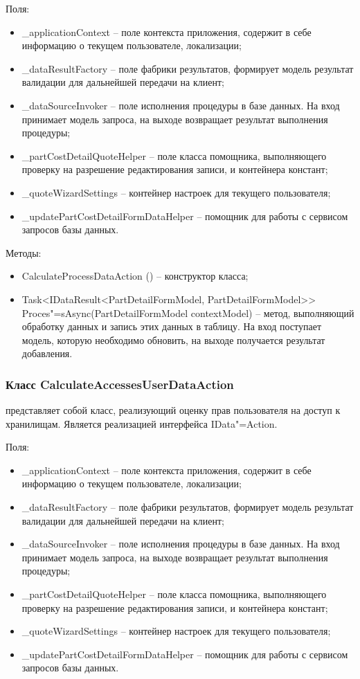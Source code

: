 Поля:
\begin{itemize}
  \item \_applicationContext – поле контекста приложения, содержит в себе информацию о текущем пользователе, локализации;
  \item \_dataResultFactory – поле фабрики результатов, формирует модель результат валидации для дальнейшей передачи на клиент;
  \item \_dataSourceInvoker – поле исполнения процедуры в базе данных. На вход принимает модель запроса, на выходе возвращает результат выполнения процедуры;
  \item \_partCostDetailQuoteHelper – поле класса помощника, выполняющего проверку на разрешение редактирования записи, и контейнера констант;
  \item \_quoteWizardSettings – контейнер настроек для текущего пользователя;
  \item \_updatePartCostDetailFormDataHelper – помощник для работы с сервисом запросов базы данных.
\end{itemize}

Методы:
\begin{itemize}
  \item CalculateProcessDataAction () – конструктор класса;
  \item Task<IDataResult<PartDetailFormModel, PartDetailFormModel>> Proces"=sAsync(PartDetailFormModel contextModel) – метод, выполняющий обработку данных и запись этих данных в таблицу. На вход поступает модель, которую необходимо обновить, на выходе получается результат добавления.
\end{itemize}

\subsubsection{Класс CalculateAccessesUserDataAction }
\label{sub:arch_and_mod:data_layer:calculate_accesses_user}

представляет собой класс, реализующий оценку прав пользователя на доступ к хранилищам. Является реализацией интерфейса IData"=Action.

Поля:
\begin{itemize}
  \item \_applicationContext – поле контекста приложения, содержит в себе информацию о текущем пользователе, локализации;
  \item \_dataResultFactory – поле фабрики результатов, формирует модель результат валидации для дальнейшей передачи на клиент;
  \item \_dataSourceInvoker – поле исполнения процедуры в базе данных. На вход принимает модель запроса, на выходе возвращает результат выполнения процедуры;
  \item \_partCostDetailQuoteHelper – поле класса помощника, выполняющего проверку на разрешение редактирования записи, и контейнера констант;
  \item \_quoteWizardSettings – контейнер настроек для текущего пользователя;
  \item \_updatePartCostDetailFormDataHelper – помощник для работы с сервисом запросов базы данных.
\end{itemize}


